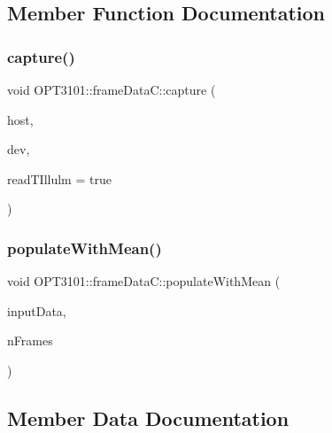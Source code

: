 \subsection{Member Function Documentation}
\mbox{\label{class_o_p_t3101_1_1frame_data_c_a01b508409579d9d47bd55080a498146d}} 
\subsubsection{\texorpdfstring{capture()}{capture()}}
{\footnotesize\ttfamily void O\+P\+T3101\+::frame\+Data\+C\+::capture (\begin{DoxyParamCaption}\item[{\mbox{\hyperlink{classhost_controller}{host\+Controller}} $\ast$}]{host,  }\item[{\mbox{\hyperlink{class_o_p_t3101_1_1device}{O\+P\+T3101\+::device}} $\ast$}]{dev,  }\item[{bool}]{read\+T\+Illulm = {\ttfamily true} }\end{DoxyParamCaption})}

\mbox{\label{class_o_p_t3101_1_1frame_data_c_a30c7f8d67291f2fd8a82a79da5d4a8bf}} 
\subsubsection{\texorpdfstring{populate\+With\+Mean()}{populateWithMean()}}
{\footnotesize\ttfamily void O\+P\+T3101\+::frame\+Data\+C\+::populate\+With\+Mean (\begin{DoxyParamCaption}\item[{\mbox{\hyperlink{class_o_p_t3101_1_1frame_data_c}{O\+P\+T3101\+::frame\+DataC}} $\ast$}]{input\+Data,  }\item[{uint16\+\_\+t}]{n\+Frames }\end{DoxyParamCaption})}



\subsection{Member Data Documentation}
\mbox{\label{class_o_p_t3101_1_1frame_data_c_abb33d925d3792c2420b0b8bf055b73c4}} 
